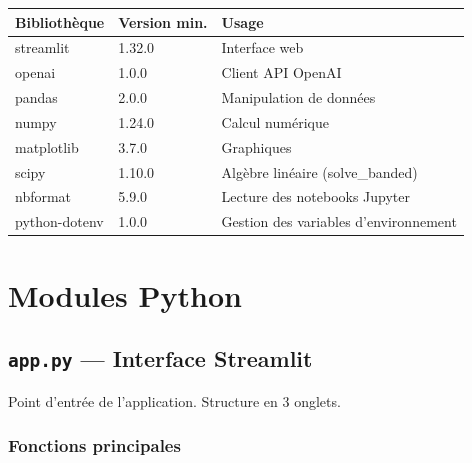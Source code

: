 \documentclass[11pt,a4paper]{article}
\begin{document}
\begin{center}
\begin{tabular}{lll}
\toprule
\textbf{Bibliothèque} & \textbf{Version min.} & \textbf{Usage} \\
\midrule
streamlit & 1.32.0 & Interface web \\
openai & 1.0.0 & Client API OpenAI \\
pandas & 2.0.0 & Manipulation de données \\
numpy & 1.24.0 & Calcul numérique \\
matplotlib & 3.7.0 & Graphiques \\
scipy & 1.10.0 & Algèbre linéaire (solve\_banded) \\
nbformat & 5.9.0 & Lecture des notebooks Jupyter \\
python-dotenv & 1.0.0 & Gestion des variables d'environnement \\
\bottomrule
\end{tabular}
\end{center}

\section{Modules Python}

\subsection{\texttt{app.py} — Interface Streamlit}

Point d'entrée de l'application. Structure en 3 onglets.

\subsubsection{Fonctions principales}
\end{document}
